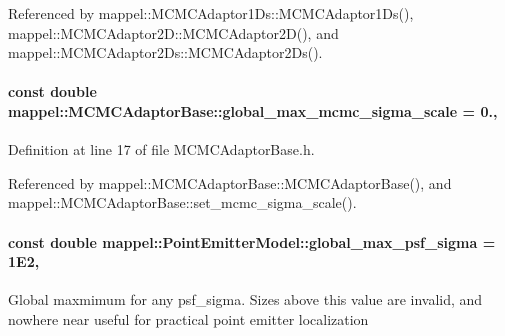 Referenced by mappel\+::\+M\+C\+M\+C\+Adaptor1\+Ds\+::\+M\+C\+M\+C\+Adaptor1\+Ds(), mappel\+::\+M\+C\+M\+C\+Adaptor2\+D\+::\+M\+C\+M\+C\+Adaptor2\+D(), and mappel\+::\+M\+C\+M\+C\+Adaptor2\+Ds\+::\+M\+C\+M\+C\+Adaptor2\+Ds().

\paragraph[{\texorpdfstring{global\+\_\+max\+\_\+mcmc\+\_\+sigma\+\_\+scale}{global_max_mcmc_sigma_scale}}]{\setlength{\rightskip}{0pt plus 5cm}const double mappel\+::\+M\+C\+M\+C\+Adaptor\+Base\+::global\+\_\+max\+\_\+mcmc\+\_\+sigma\+\_\+scale = 0.\hspace{0.3cm}{\ttfamily [static]}, {\ttfamily [inherited]}}\hypertarget{classmappel_1_1MCMCAdaptorBase_aebc93881ca351e67de867238a62579eb}{}\label{classmappel_1_1MCMCAdaptorBase_aebc93881ca351e67de867238a62579eb}


Definition at line 17 of file M\+C\+M\+C\+Adaptor\+Base.\+h.



Referenced by mappel\+::\+M\+C\+M\+C\+Adaptor\+Base\+::\+M\+C\+M\+C\+Adaptor\+Base(), and mappel\+::\+M\+C\+M\+C\+Adaptor\+Base\+::set\+\_\+mcmc\+\_\+sigma\+\_\+scale().

\paragraph[{\texorpdfstring{global\+\_\+max\+\_\+psf\+\_\+sigma}{global_max_psf_sigma}}]{\setlength{\rightskip}{0pt plus 5cm}const double mappel\+::\+Point\+Emitter\+Model\+::global\+\_\+max\+\_\+psf\+\_\+sigma = 1\+E2\hspace{0.3cm}{\ttfamily [static]}, {\ttfamily [inherited]}}\hypertarget{classmappel_1_1PointEmitterModel_a5e79dba8966c25c4e9c675cd1a2cab70}{}\label{classmappel_1_1PointEmitterModel_a5e79dba8966c25c4e9c675cd1a2cab70}
Global maxmimum for any psf\+\_\+sigma. Sizes above this value are invalid, and nowhere near useful for practical point emitter localization 

